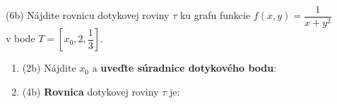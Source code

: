 \pr (6b) Nájdite rovnicu dotykovej roviny $\tau$ ku grafu funkcie
$\displaystyle f(x,y)=\dfrac{1}{x+y^2}$ \\
\hspace*{1.4cm} v bode $T=\left[x_{0},2,\dfrac{1}{3}\right]$.

\begin{enumerate}
\item[] (2b) Nájdite $x_0$ a  \textbf{uveďte súradnice dotykového bodu}: \gr
\item[] (4b) \textbf{Rovnica} dotykovej roviny $\tau$ je:\gr
\end{enumerate}
